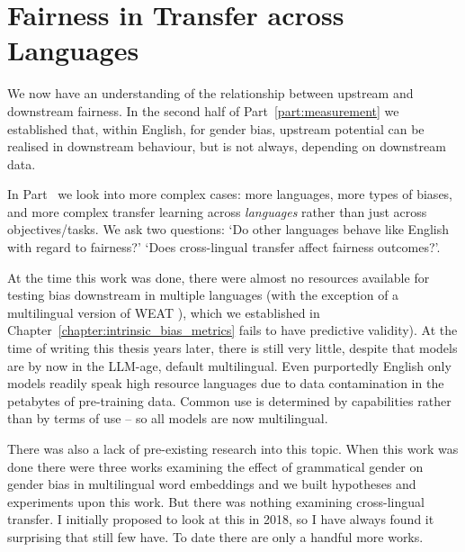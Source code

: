 \part{Fairness in Transfer across Languages}
\label{part:crosslingual}

We now have an understanding of the relationship between upstream and downstream fairness. 
In the second half of Part~\ref{part:measurement} we established that, within English, for gender bias, upstream potential can be realised in downstream behaviour, but is not always, depending on downstream data.

In Part~\ref{part:crosslingual} we look into more complex cases: more languages, more types of biases, and more complex transfer learning across \textit{languages} rather than just across objectives/tasks. We ask two questions: `Do other languages behave like English with regard to fairness?' `Does cross-lingual transfer affect fairness outcomes?'. 

At the time this work was done, there were almost no resources available for testing bias downstream in multiple languages (with the exception of a multilingual version of WEAT \citep{lauscher-glavas-2019-consistently}), which we established in Chapter~\ref{chapter:intrinsic_bias_metrics} fails to have predictive validity). At the time of writing this thesis years later, there is still very little, despite that models are by now in the LLM-age, default multilingual. Even purportedly English only models readily speak high resource languages due to data contamination in the petabytes of pre-training data. Common use is determined by capabilities rather than by terms of use -- so all models are now multilingual.

There was also a lack of pre-existing research into this topic. When this work was done there were three works examining the effect of grammatical gender on gender bias in multilingual word embeddings \citep{gonen-etal-2019-grammatical, zhou-etal-2019-examining, McCurdy2017GrammaticalGA} and we built hypotheses and experiments upon this work. But there was nothing examining cross-lingual transfer. I initially proposed to look at this in 2018, so I have always found it surprising that still few have. To date there are only a handful more works. 

